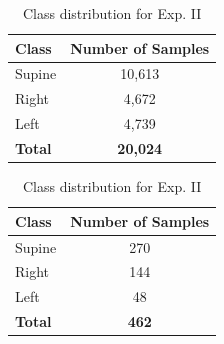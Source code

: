\documentclass[9pt]{beamer}
\begin{document}
{    \begin{table}[ht]
    \centering
    \begin{minipage}{0.45\textwidth}
      \tiny
      \centering
      \begin{tabular}{|l|c|}
        \hline
        \textbf{Class} & \textbf{Number of Samples} \\
        \hline
        Supine & 10,613 \\
        Right & 4,672 \\
        Left & 4,739 \\
        \hline
        \textbf{Total} & \textbf{20,024} \\
        \hline
      \end{tabular}
      \caption{\scriptsize Class distribution for Exp. I}
      \label{tab:exp1}
    \end{minipage}
    \hfill
    \begin{minipage}{0.45\textwidth}
      \tiny
      \centering
      \begin{tabular}{|l|c|}
        \hline
        \textbf{Class} & \textbf{Number of Samples} \\
        \hline
        Supine & 270 \\
        Right & 144 \\
        Left & 48 \\
        \hline
        \textbf{Total} & \textbf{462} \\
        \hline
      \end{tabular}
      \caption{\scriptsize Class distribution for Exp. II}
      \label{tab:exp2}
    \end{minipage}
    \end{table}
  }
\end{document}
